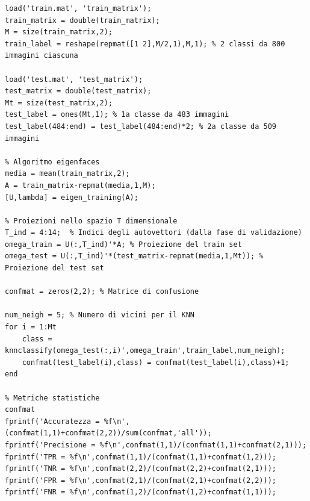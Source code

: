 \documentclass[12pt]{article}
\begin{document}
\begin{verbatim}
load('train.mat', 'train_matrix');
train_matrix = double(train_matrix);
M = size(train_matrix,2);
train_label = reshape(repmat([1 2],M/2,1),M,1); % 2 classi da 800 immagini ciascuna

load('test.mat', 'test_matrix');
test_matrix = double(test_matrix);
Mt = size(test_matrix,2);
test_label = ones(Mt,1); % 1a classe da 483 immagini
test_label(484:end) = test_label(484:end)*2; % 2a classe da 509 immagini

% Algoritmo eigenfaces
media = mean(train_matrix,2);
A = train_matrix-repmat(media,1,M);
[U,lambda] = eigen_training(A);

% Proiezioni nello spazio T dimensionale
T_ind = 4:14;  % Indici degli autovettori (dalla fase di validazione)
omega_train = U(:,T_ind)'*A; % Proiezione del train set
omega_test = U(:,T_ind)'*(test_matrix-repmat(media,1,Mt)); % Proiezione del test set

confmat = zeros(2,2); % Matrice di confusione

num_neigh = 5; % Numero di vicini per il KNN
for i = 1:Mt
    class = knnclassify(omega_test(:,i)',omega_train',train_label,num_neigh);
    confmat(test_label(i),class) = confmat(test_label(i),class)+1;  
end

% Metriche statistiche
confmat
fprintf('Accuratezza = %f\n',(confmat(1,1)+confmat(2,2))/sum(confmat,'all'));
fprintf('Precisione = %f\n',confmat(1,1)/(confmat(1,1)+confmat(2,1)));
fprintf('TPR = %f\n',confmat(1,1)/(confmat(1,1)+confmat(1,2)));
fprintf('TNR = %f\n',confmat(2,2)/(confmat(2,2)+confmat(2,1)));
fprintf('FPR = %f\n',confmat(2,1)/(confmat(2,1)+confmat(2,2)));
fprintf('FNR = %f\n',confmat(1,2)/(confmat(1,2)+confmat(1,1)));
\end{verbatim}
\end{document}
